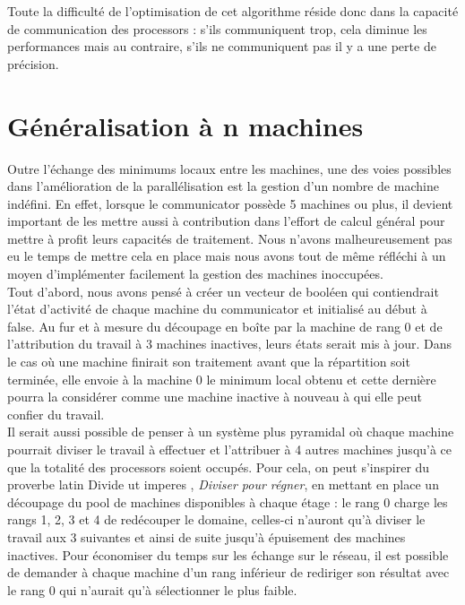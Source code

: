 		Toute la difficulté de l'optimisation de cet algorithme réside donc dans la capacité de communication des processors : s'ils communiquent trop, cela diminue les performances mais au contraire, s'ils ne communiquent pas il y a une perte de précision.
		
	\newpage
	\section{Généralisation à n machines}
		Outre l'échange des minimums locaux entre les machines, une des voies possibles dans l'amélioration de la parallélisation est la gestion d'un nombre de machine indéfini. En effet, lorsque le communicator possède 5 machines ou plus, il devient important de les mettre aussi à contribution dans l'effort de calcul général pour mettre à profit leurs capacités de traitement. Nous n'avons malheureusement pas eu le temps de mettre cela en place mais nous avons tout de même réfléchi à un moyen d'implémenter facilement la gestion des machines inoccupées. \\
		
		Tout d'abord, nous avons pensé à créer un vecteur de booléen qui contiendrait l'état d'activité de chaque machine du communicator et initialisé au début à false. Au fur et à mesure du découpage en boîte par la machine de rang 0 et de l'attribution du travail à 3 machines inactives, leurs états serait mis à jour. Dans le cas où une machine finirait son traitement avant que la répartition soit terminée, elle envoie à la machine 0 le minimum local obtenu et cette dernière pourra la considérer comme une machine inactive à nouveau à qui elle peut confier du travail.  \\
		
		Il serait aussi possible de penser à un système plus pyramidal où chaque machine pourrait diviser le travail à effectuer et l'attribuer à 4 autres machines jusqu'à ce que la totalité des processors soient occupés. Pour cela, on peut s'inspirer du proverbe latin \og Divide ut imperes \fg, \emph{Diviser pour régner}, en mettant en place un découpage du pool de machines disponibles à chaque étage : le rang 0 charge les rangs 1, 2, 3 et 4 de redécouper le domaine, celles-ci n'auront qu'à diviser le travail aux 3 suivantes et ainsi de suite jusqu'à épuisement des machines inactives. Pour économiser du temps sur les échange sur le réseau, il est possible de demander à chaque machine d'un rang inférieur de rediriger son résultat avec le rang 0 qui n'aurait qu'à sélectionner le plus faible.
			
